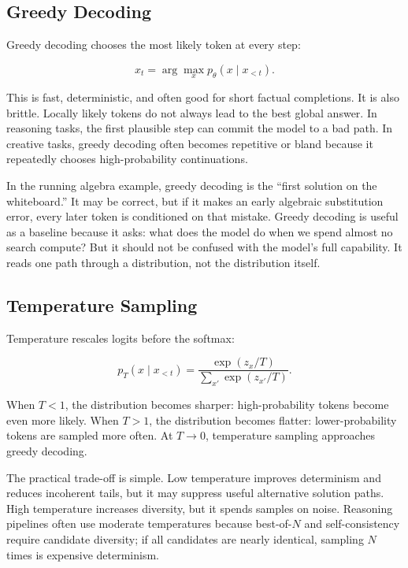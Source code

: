 \subsection{Greedy Decoding}

Greedy decoding chooses the most likely token at every step:

\begin{equation}
  x_t = \arg\max_x p_\theta(x \mid x_{<t}).
\end{equation}

This is fast, deterministic, and often good for short factual completions. It is also brittle. Locally likely tokens do not always lead to the best global answer. In reasoning tasks, the first plausible step can commit the model to a bad path. In creative tasks, greedy decoding often becomes repetitive or bland because it repeatedly chooses high-probability continuations.

In the running algebra example, greedy decoding is the ``first solution on the whiteboard.'' It may be correct, but if it makes an early algebraic substitution error, every later token is conditioned on that mistake. Greedy decoding is useful as a baseline because it asks: what does the model do when we spend almost no search compute? But it should not be confused with the model's full capability. It reads one path through a distribution, not the distribution itself.

\subsection{Temperature Sampling}

Temperature rescales logits before the softmax:

\begin{equation}
  p_T(x \mid x_{<t}) =
  \frac{\exp(z_x/T)}{\sum_{x'} \exp(z_{x'}/T)}.
  \label{eq:temperature}
\end{equation}

When $T<1$, the distribution becomes sharper: high-probability tokens become even more likely. When $T>1$, the distribution becomes flatter: lower-probability tokens are sampled more often. At $T \to 0$, temperature sampling approaches greedy decoding.

The practical trade-off is simple. Low temperature improves determinism and reduces incoherent tails, but it may suppress useful alternative solution paths. High temperature increases diversity, but it spends samples on noise. Reasoning pipelines often use moderate temperatures because best-of-$N$ and self-consistency require candidate diversity; if all candidates are nearly identical, sampling $N$ times is expensive determinism.

